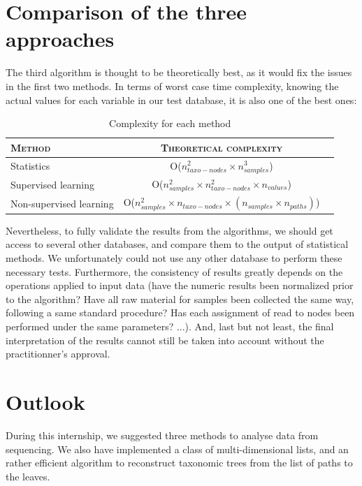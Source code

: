 \documentclass{report}
\begin{document}
\newpage

\chapter{Comparison of the three approaches}

The third algorithm is thought to be theoretically best, as it would fix the issues in the first two methods. In terms of worst case time complexity, knowing the actual values for each variable in our test database, it is also one of the best ones:\\

    \begin{table}
      \caption{Complexity for each method}
      \begin{tabular}{|l|c|r|}
        \hline
        \textsc{Method} & \textsc{Theoretical complexity} \\
        \hline
        Statistics & O($n_{taxo-nodes}^{2} \times n_{samples}^{3}$)\\
        \hline
        Supervised learning & O($n_{samples}^{2} \times n_{taxo-nodes}^{2} \times n_{values}$)\\
        \hline
        Non-supervised learning & O($n_{samples}^{2} \times n_{taxo-nodes}\times (n_{samples} \times n_{paths})$)\\
        \hline
      \end{tabular}
    \end{table}

Nevertheless, to fully validate the results from the algorithms, we should get access to several other databases, and compare them to the output of statistical methods. We unfortunately could not use any other database to perform these necessary tests. Furthermore, the consistency of results greatly depends on the operations applied to input data (have the numeric results been normalized prior to the algorithm? Have all raw material for samples been collected the same way, following a same standard procedure? Has each assignment of read to nodes been performed under the same parameters? ...). And, last but not least, the final interpretation of the results cannot still be taken into account without the practitionner's approval.

\chapter{Outlook}

During this internship, we suggested three methods to analyse data from sequencing. We also have implemented a class of multi-dimensional lists, and an rather efficient algorithm to reconstruct taxonomic trees from the list of paths to the leaves.\\
\end{document}
